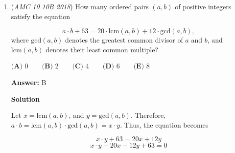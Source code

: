 \begin{enumerate}
 
 \[1^2=x^2+y^2-2xy\cos(\theta)\]

 where $x$ and $y$ are the sides that go from $[0,1]$ and $\theta$ is the angle opposite the side of length $1$.

 By isolating $\cos(\theta)$, we get:

 
 \[\frac{1-x^2-y^2}{-2xy} = \cos(\theta)\]

 For $\theta$ to be obtuse, $\cos(\theta)$ must be negative. Therefore, $\frac{1-x^2-y^2}{-2xy}$ is negative. Since $x$ and $y$ must be positive, $-2xy$ must be negative, so we must make $1-x^2-y^2$ positive. From here, we can set up the inequality
 \[x^2+y^2<1\]Additionally, to satisfy the definition of a triangle, we need:
 \[x+y>1\]The solution should be the overlap between the two equations in the first quadrant.

 By observing that $x^2+y^2<1$ is the equation for a circle, the amount that is in the first quadrant is $\frac{\pi}{4}$. The line can also be seen as a chord that goes from $(0, 1)$ to $(1, 0)$. By cutting off the triangle of area $\frac{1}{2}$ that is not part of the overlap, we get $\frac{\pi}{4} - \frac{1}{2} \approx \boxed{\textbf{(C)} ~0.29}$.

 ..why would you do this? for what purpose? its much more complicated and this is the AMC 10! -Orion 2010

 Edit: This is just a way to prove the pythagorean inequality if you don't already know it.

 


	\item (\textit{AMC 10 10B 2018}) How many ordered pairs $(a, b)$ of positive integers satisfy the equation 

 \[a\cdot b + 63 = 20\cdot \text{lcm}(a, b) + 12\cdot\text{gcd}(a,b),\]
where $\text{gcd}(a,b)$ denotes the greatest common divisor of $a$ and $b$, and $\text{lcm}(a,b)$ denotes their least common multiple?


 $\textbf{(A)} \text{ 0} \qquad \textbf{(B)} \text{ 2} \qquad \textbf{(C)} \text{ 4} \qquad \textbf{(D)} \text{ 6} \qquad \textbf{(E)} \text{ 8}$

 \textbf{Answer: }B



\textbf{Solution}

Let $x = \text{lcm}(a, b)$, and $y = \text{gcd}(a, b)$. Therefore, $a\cdot b = \text{lcm}(a, b)\cdot \text{gcd}(a, b) = x\cdot y$. Thus, the equation becomes

 
 \[x\cdot y + 63 = 20x + 12y\]
 \[x\cdot y - 20x - 12y + 63 = 0\]


\end{enumerate}
